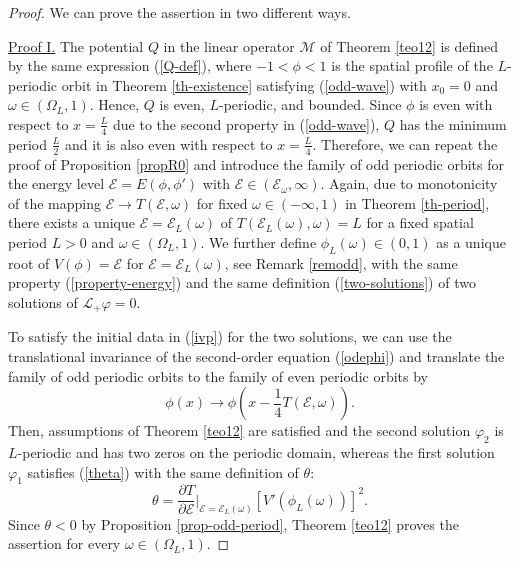 \documentclass[12pt,reqno]{amsart}
\numberwithin{equation}{section}
\numberwithin{figure}{section}
\begin{document}
\begin{proof} 
We can prove the assertion in two different ways.

\underline{Proof I.} The potential $Q$ in the linear operator $\mathcal{M}$ of Theorem \ref{teo12} is defined by the same expression (\ref{Q-def}), 
where $-1 < \phi < 1$ is the spatial profile of the $L$-periodic orbit in Theorem \ref{th-existence} satisfying (\ref{odd-wave}) with $x_0 = 0$ and $\omega \in (\Omega_L,1)$. Hence, $Q$ is even, $L$-periodic, and bounded. 
Since $\phi$ is even with respect to $x = \frac{L}{4}$ due to the second property in (\ref{odd-wave}), $Q$ has the minimum period $\frac{L}{2}$ and it is also even with respect to $x = \frac{L}{4}$. Therefore, we can repeat the proof of Proposition \ref{propR0} and introduce the family of odd periodic orbits for the energy level $\mathcal{E} = E(\phi,\phi')$ with $\mathcal{E}\in (\mathcal{E}_{\omega},\infty)$. Again, due to monotonicity of the mapping $\mathcal{E}\to T(\mathcal{E},\omega)$ for fixed $\omega \in (-\infty,1)$ in Theorem \ref{th-period}, there exists a unique $\mathcal{E} = \mathcal{E}_L(\omega)$ of $T(\mathcal{E}_L(\omega),\omega) = L$ for a fixed spatial period $L > 0$ and $\omega \in (\Omega_L,1)$. We further define $\phi_L(\omega) \in (0,1)$ as a unique root of $V(\phi) = \mathcal{E}$ for $\mathcal{E} = \mathcal{E}_L(\omega)$, see Remark \ref{remodd}, with the same 
property (\ref{property-energy}) and the same definition (\ref{two-solutions}) of 
two solutions of $\mathcal{L}_+ \varphi = 0$. 

To satisfy the initial data in (\ref{ivp}) for the two solutions, 
we can use the translational invariance of the second-order equation (\ref{odephi}) and translate the family of odd periodic orbits to the family of even periodic orbits by 
\begin{equation}
\label{translation-quarter}
\phi(x) \to \phi\left(x - \frac{1}{4} T(\mathcal{E},\omega)\right).
\end{equation}
Then, assumptions of Theorem \ref{teo12} are satisfied and 
the second solution $\varphi_2$ is $L$-periodic and has two zeros on the periodic domain, whereas the first solution $\varphi_1$ satisfies (\ref{theta}) with the same definition of $\theta$:
$$
\theta = \frac{\partial T}{\partial \mathcal{E}} \biggr|_{\mathcal{E} = \mathcal{E}_L(\omega)} \left[ V'(\phi_L(\omega)) \right]^2.
$$
Since $\theta < 0$ by Proposition \ref{prop-odd-period}, Theorem \ref{teo12} proves the assertion for every $\omega \in (\Omega_L,1)$. 	



\end{proof}
\end{document}
